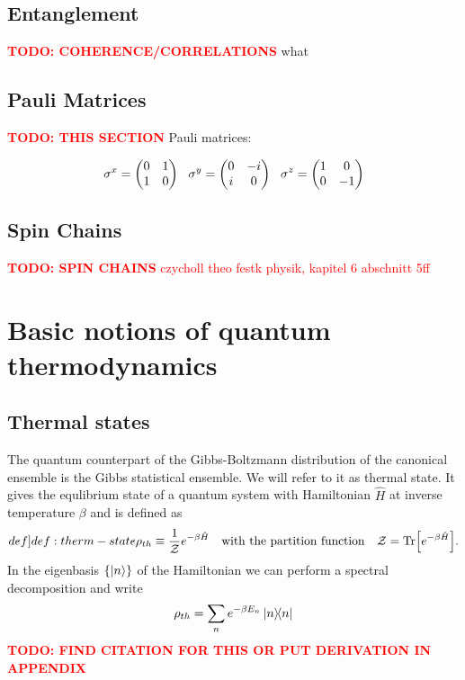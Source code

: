 \documentclass{book}
\numberwithin{equation}{section} %
\begin{document}


\subsection{Entanglement}
\textcolor{red}{\textbf{TODO: COHERENCE/CORRELATIONS}}
what


\subsection{Pauli Matrices}
\textcolor{red}{\textbf{TODO: THIS SECTION}}
Pauli matrices:

\begin{align}
    \sigma^x = \pmqty{\mqty{\pmat{1}}} \ \ \sigma^y = \pmqty{\mqty{\pmat{2}}} \ \ \sigma^z = \pmqty{\mqty{\pmat{3}}}
\end{align}

\subsection{Spin Chains}
\textcolor{red}{\textbf{TODO: SPIN CHAINS}}
\textcolor{red}{czycholl theo festk physik, kapitel 6 abschnitt 5ff}

\section{Basic notions of quantum thermodynamics}
\subsection{Thermal states}\label{sec:thermal-states}
The quantum counterpart of the Gibbs-Boltzmann distribution of the canonical ensemble is the Gibbs statistical ensemble. We will refer to it
as thermal state. It gives the equlibrium state of a quantum system with Hamiltonian $\hat{H}$ at inverse temperature $\beta$
and is defined as \cite{BA_Alicki2018}
\begin{align}\label[def]{def:therm-state}
    \rho_{th} \equiv \frac{1}{\mathcal{Z}}e^{-\beta\hat{H}} \qq{with the partition function} \mathcal{Z} = \Tr[e^{-\beta\hat{H}}].
\end{align}
In the eigenbasis $\{\ket{n}\}$ of the Hamiltonian we can perform a spectral decomposition and write
\begin{align}\label{eq:rho-therm-eigbasis}
    \rho_{th} = \sum\limits_n e^{-\beta E_n} \dyad{n}
\end{align}
\textcolor{red}{\textbf{TODO: FIND CITATION FOR THIS OR PUT DERIVATION IN APPENDIX}}
\end{document}
